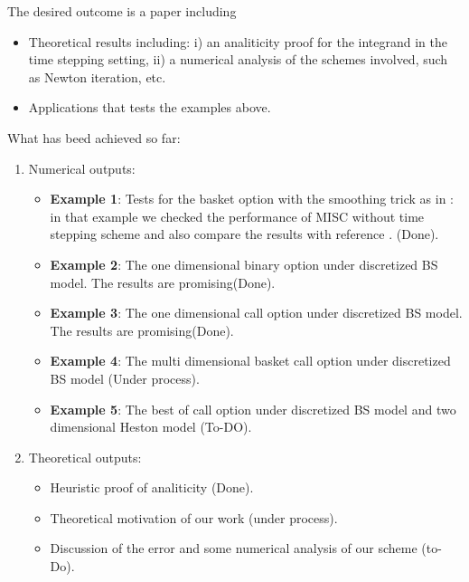 \documentclass[11pt]{article}
\begin{document}
The desired  outcome is a paper including 
\begin{itemize}
		\item Theoretical results including: i) an analiticity proof for the integrand in the time stepping setting, ii) a numerical analysis of the schemes involved, such as Newton iteration, etc.
	\item Applications that  tests the examples above.

\end{itemize}
What has beed achieved so far: 

\begin{enumerate}
	\item Numerical outputs:
	\begin{itemize}
	
	 \item \textbf{Example 1}: Tests for  the basket option with the smoothing trick as in \cite{bayersmoothing}: in that example we  checked the performance of MISC without time stepping scheme and also compare the results with reference \cite{bayersmoothing}. (Done).
	
	
	
		\item 	  \textbf{Example 2}: The one dimensional binary option under discretized BS model. The results are  promising(Done).
		
		\item \textbf{Example 3}: The one dimensional call option under discretized BS model. The results are  promising(Done).
		
		\item \textbf{Example 4}: The multi dimensional basket call option under discretized BS model (Under process).
		\item \textbf{Example 5}: The best of call option under discretized BS model and two dimensional Heston model (To-DO).
		\end{itemize}
	\item  Theoretical outputs:
	\begin{itemize}
		\item Heuristic proof of analiticity (Done).
		\item Theoretical motivation of our work  (under process).
		\item Discussion of the error and some numerical analysis of our scheme (to-Do).
	\end{itemize}
\end{enumerate}








 







 

 

 
 
 
\end{document}

